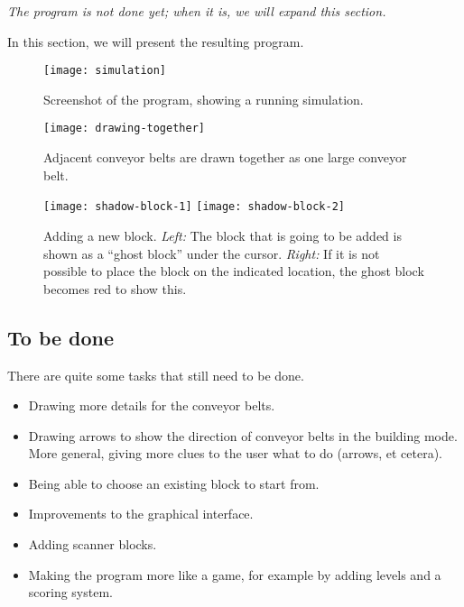 \textit{The program is not done yet; when it is, we will expand this section.}

In this section, we will present the resulting program.

\begin{figure}
  \begin{center}
    \texttt{[image: simulation]}
    \caption{Screenshot of the program, showing a running simulation.}
    \label{fig:simulation}
  \end{center}
\end{figure}

\begin{figure}
  \begin{center}
    \texttt{[image: drawing-together]}
    \caption{Adjacent conveyor belts are drawn together as one large conveyor belt.}
    \label{fig:drawing-together}
  \end{center}
\end{figure}

\begin{figure}
  \begin{center}
    \texttt{[image: shadow-block-1]}
    \quad
    \texttt{[image: shadow-block-2]}
    \caption{Adding a new block. \textit{Left:} The block that is going to be added is shown as a ``ghost block'' under the cursor. \textit{Right:} If it is not possible to place the block on the indicated location, the ghost block becomes red to show this.}
    \label{fig:shadow-block}
  \end{center}
\end{figure}

\subsection{To be done}
There are quite some tasks that still need to be done.
\begin{itemize}
 \item Drawing more details for the conveyor belts.
 \item Drawing arrows to show the direction of conveyor belts in the building mode. More general, giving more clues to the user what to do (arrows, et cetera).
 \item Being able to choose an existing block to start from.
 \item Improvements to the graphical interface.
 \item Adding scanner blocks.
 \item Making the program more like a game, for example by adding levels and a scoring system.
\end{itemize}

